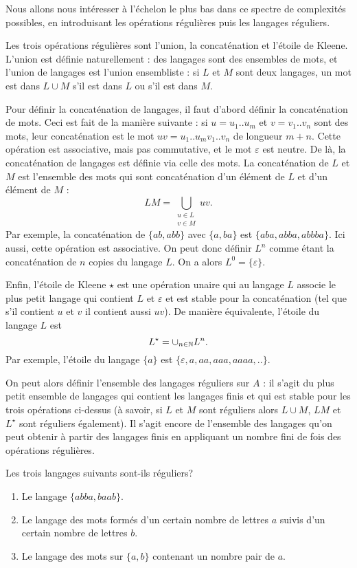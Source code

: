 Nous allons nous intéresser à l'échelon le plus bas dans ce spectre de complexités possibles, en introduisant les opérations régulières puis les langages réguliers.

Les trois opérations régulières sont l'union, la concaténation et l'étoile de Kleene.
L'union est définie naturellement : des langages sont des ensembles de mots, et l'union de langages est l'union ensembliste : si $L$ et $M$ sont deux langages, un mot est dans $L\cup M$ s'il est dans $L$ ou s'il est dans $M$.

Pour définir la concaténation de langages, il faut d'abord définir la concaténation de mots. Ceci est fait de la manière suivante : si $u=u_1..u_m$ et $v=v_1..v_n$ sont des mots, leur concaténation est le mot $uv=u_1..u_mv_1..v_n$ de longueur $m+n$. Cette opération est associative, mais pas commutative, et le mot $\varepsilon$ est neutre.
De là, la concaténation de langages est définie via celle des mots. La concaténation de $L$ et $M$ est l'ensemble des mots qui sont concaténation d'un élément de $L$ et d'un élément de $M$ :
\[LM=\bigcup_{\substack{u\in L\\ v\in M}} uv.\]
Par exemple, la concaténation de $\{ab,abb\}$ avec $\{a,ba\}$ est $\{aba,abba,abbba\}$. Ici aussi, cette opération est associative. On peut donc définir $L^n$ comme étant la concaténation de $n$ copies du langage $L$. On a alors $L^0=\{\varepsilon\}$.

Enfin, l'étoile de Kleene $\star$ est une opération unaire qui au langage $L$ associe le plus petit langage qui contient $L$ et $\varepsilon$ et est stable pour la concaténation (tel que s'il contient $u$ et $v$ il contient aussi $uv$). De manière équivalente, l'étoile du langage $L$ est
\[L^\star=\cup_{n\in\mathbb N} L^n.\]
Par exemple, l'étoile du langage $\{a\}$ est $\{\varepsilon,a,aa,aaa,aaaa,..\}$.

On peut alors définir l'ensemble des langages réguliers sur $A$ : il s'agit du plus petit ensemble de langages qui contient les langages finis et qui est stable pour les trois opérations ci-dessus (à savoir, si $L$ et $M$ sont réguliers alors $L\cup M$, $LM$ et $L^\star$ sont réguliers également). Il s'agit encore de l'ensemble des langages qu'on peut obtenir à partir des langages finis en appliquant un nombre fini de fois des opérations régulières.

\begin{exo}
Les trois langages suivants sont-ils réguliers?
\begin{enumerate}
\item Le langage $\{abba,baab\}$.
\item Le langage des mots formés d'un certain nombre de lettres $a$ suivis d'un certain nombre de lettres $b$.
\item Le langage des mots sur $\{a,b\}$ contenant un nombre pair de $a$.
\end{enumerate}
\end{exo}

